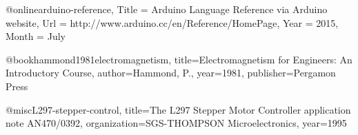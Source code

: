 @online{arduino-reference,
	Title = {{Arduino Language Reference} via Arduino website},
	Url = {http://www.arduino.cc/en/Reference/HomePage},
	Year = {2015},
	Month = {July}}

@book{hammond1981electromagnetism,
  title={Electromagnetism for Engineers: An Introductory Course},
  author={Hammond, P.},
  year={1981},
  publisher={Pergamon Press}
}

@misc{L297-stepper-control,
  title={{The L297 Stepper Motor Controller} application note {AN470/0392}},
  organization={SGS-THOMPSON Microelectronics},
  year={1995}
}

